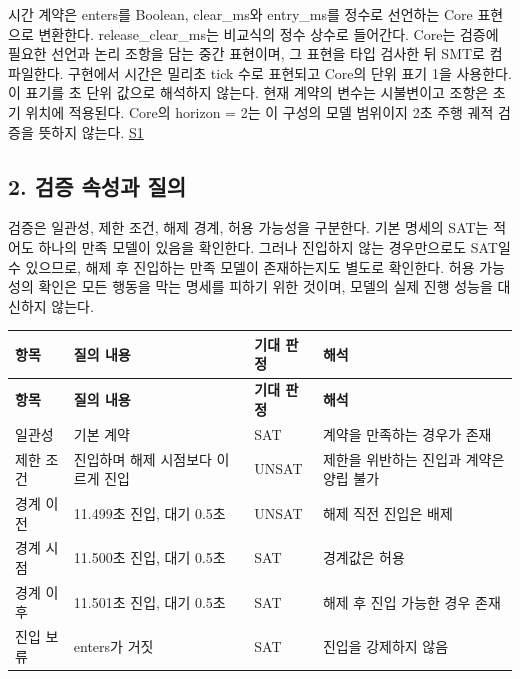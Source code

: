 \documentclass[11pt,a4paper]{article}
\begin{document}
시간 계약은 {\ttfamily\small enters}를 Boolean, {\ttfamily\small clear\_\allowbreak{}ms}와 {\ttfamily\small entry\_\allowbreak{}ms}를 정수로 선언하는 Core 표현으로 변환한다. {\ttfamily\small release\_\allowbreak{}clear\_\allowbreak{}ms}는 비교식의 정수 상수로 들어간다. Core는 검증에 필요한 선언과 논리 조항을 담는 중간 표현이며, 그 표현을 타입 검사한 뒤 SMT로 컴파일한다. 구현에서 시간은 밀리초 tick 수로 표현되고 Core의 단위 표기 {\ttfamily\small 1}을 사용한다. 이 표기를 초 단위 값으로 해석하지 않는다. 현재 계약의 변수는 시불변이고 조항은 초기 위치에 적용된다. Core의 {\ttfamily\small horizon = 2}는 이 구성의 모델 범위이지 2초 주행 궤적 검증을 뜻하지 않는다. \href{\detokenize{../../../../../../projects/04-guardsynth-coc/experiments/paper1_cnl_learning/temporal_preservation.py}}{S1}\par

\subsection*{2. 검증 속성과 질의}

검증은 일관성, 제한 조건, 해제 경계, 허용 가능성을 구분한다. 기본 명세의 SAT는 적어도 하나의 만족 모델이 있음을 확인한다. 그러나 진입하지 않는 경우만으로도 SAT일 수 있으므로, 해제 후 진입하는 만족 모델이 존재하는지도 별도로 확인한다. 허용 가능성의 확인은 모든 행동을 막는 명세를 피하기 위한 것이며, 모델의 실제 진행 성능을 대신하지 않는다.\par

\begingroup\small
\begin{longtable}{@{}>{\raggedright\arraybackslash}p{}>{\raggedright\arraybackslash}p{}>{\raggedright\arraybackslash}p{}>{\raggedright\arraybackslash}p{}@{}}
\toprule
\textbf{항목} & \textbf{질의 내용} & \textbf{기대 판정} & \textbf{해석} \\
\midrule\endfirsthead
\toprule
\textbf{항목} & \textbf{질의 내용} & \textbf{기대 판정} & \textbf{해석} \\
\midrule\endhead
\bottomrule\endfoot
일관성 & 기본 계약 & SAT & 계약을 만족하는 경우가 존재 \\
제한 조건 & 진입하며 해제 시점보다 이르게 진입 & UNSAT & 제한을 위반하는 진입과 계약은 양립 불가 \\
경계 이전 & 11.499초 진입, 대기 0.5초 & UNSAT & 해제 직전 진입은 배제 \\
경계 시점 & 11.500초 진입, 대기 0.5초 & SAT & 경계값은 허용 \\
경계 이후 & 11.501초 진입, 대기 0.5초 & SAT & 해제 후 진입 가능한 경우 존재 \\
진입 보류 & enters가 거짓 & SAT & 진입을 강제하지 않음 \\
\end{longtable}
\endgroup
\end{document}
